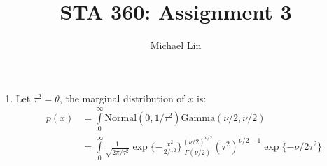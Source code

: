 \documentclass{article}
\title{STA 360: Assignment 3}
\author{Michael Lin}
\begin{document}
\maketitle

\begin{enumerate}
\item Let $\tau^2=\theta$, the marginal distribution of $x$ is:
\begin{align*}
p(x)&=\int\limits_{0}^{\infty } \text{Normal}(0,1/\tau^2)\text{Gamma}(\nu/2,\nu/2) \\
&=\int\limits_{0}^{\infty} \frac{1}{\sqrt{2\pi/\tau^2}}\exp\{-\frac{x^2}{2/\tau^2} \} \frac{(\nu/2)^{\nu/2}}{\Gamma(\nu/2)}(\tau^2)^{\nu/2-1}\exp\{-\nu/2 \tau^2 \} \\
\end{align*}
\end{enumerate}
\end{document}
